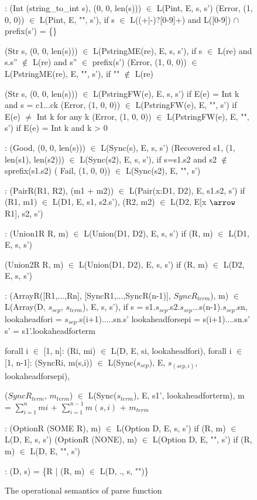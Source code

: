 \begin{figure}[ht]
\begin{center}
{\small
\begin{code}
\cdmath
{}:
  (Int (string\_to\_int s), (0, 0, len(s))) $\in$ L(Pint, E, s, s')
  (Error, (1, 0, 0)) $\in$ L(Pint, E, "", s'), 
  if s $\in$ L((+|-)?[0-9]+) and L([0-9]) $\cap$ prefix(s') = \{\}

  (Str s, (0, 0, len(s))) $\in$ L(PstringME(re), E, s, s'),
	if s $\in$ L(re) and s.s'' $\not\in$ L(re) and s'' $\in$ prefix(s') 
  (Error, (1, 0, 0)) $\in$ L(PstringME(re), E, "", s'), if "" $\not\in$ L(re)

  (Str s, (0, 0, len(s))) $\in$ L(PstringFW(e), E, s, s') if E(e) = Int k and s = c1...ck
  (Error, (1, 0, 0)) $\in$ L(PstringFW(e), E, "", s') if E(e) $\ne$ Int k for any k
  (Error, (1, 0, 0)) $\in$ L(PstringFW(e), E, "", s') if E(e) = Int k and k > 0

:
  (Good, (0, 0, len(s))) $\in$ L(Sync(s), E, s, s')
  (Recovered s1, (1, len(s1), len(s2))) $\in$ L(Sync(s2), E, s, s'), if s=s1.s2 and s2 $\not\in$ sprefix(s1.s2)
(  Fail, (1, 0, 0)) $\in$ L(Sync(s2), E, "", s')

:
  (PairR(R1, R2), (m1 + m2)) $\in$ L(Pair(x:D1, D2), E, s1.s2, s')
        if (R1, m1) $\in$ L(D1, E, s1, s2.s'),
           (R2, m2) $\in$ L(D2, E[x $\arrow$ R1], s2, s')

:
  (Union1R R, m) $\in$ L(Union(D1, D2), E, s, s')
        if (R, m) $\in$ L(D1, E, s, s')

  (Union2R R, m) $\in$ L(Union(D1, D2), E, s, s')
        if (R, m) $\in$ L(D2, E, s, s')

:
  (ArrayR([R1,...,Rn], [SyncR1,...,SyncR(n-1)], $SyncR_{term}$), m)
    $\in$ L(Array(D, $s_{sep}$, $s_{term}$), E, s, s'),
        if
        s = s1.$s_{sep}$.s2.$s_{sep}$...s(n-1).$s_{sep}$.sn,
        lookaheadfori = $s_{sep}$.s(i+1).....sn.s'
        lookaheadforsepi = s(i+1)....sn.s'
        s' = s1'.lookaheadforterm

        forall i $\in$ [1, n]:
          (Ri, mi) $\in$ L(D, E, si, lookaheadfori),
        forall i $\in$ [1, n-1]:
          (SyncRi, m(s,i)) $\in$ L(Sync($s_{sep}$), E, $s_{(sep,i)}$, lookaheadforsepi),

        ($SyncR_{term}$, $m_{term}$) $\in$ L(Sync($s_{term}$), E, s1', lookaheadforterm),
        m = $\sum_{i= 1}^{n} mi$ + $\sum_{i=1}^{n-1} m(s,i)$ + $m_{term}$

:
  (OptionR (SOME R), m) $\in$ L(Option D, E, s, s')
	if (R, m) $\in$ L(D, E, s, s')
  (OptionR (NONE), m) $\in$ L(Option D, E, "", s')
	if (R, m) $\in$ L(D, E, "", s')

:
  (D, s) = \{R | (R, m) $\in$ L(D, ., s, "")\} 
\end{code}
}
\caption{The operational semantics of parse function}
\label{fig:parse-sem}
\end{center}
\end{figure}

